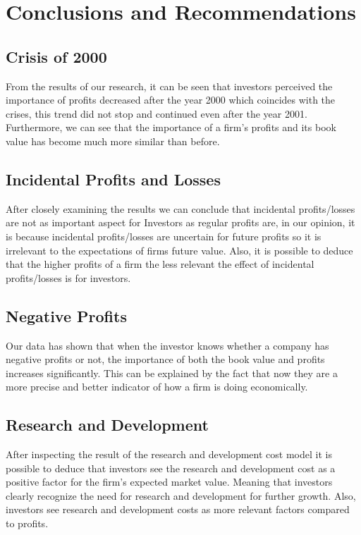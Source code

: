 \documentclass[11pt, letterpaper]{article}
\begin{document}
\newpage

\section{Conclusions and Recommendations}
\subsection{Crisis of 2000}
From the results of our research, it can be seen that investors perceived the importance of profits decreased after the year 2000 which coincides with the crises, this trend did not stop and continued even after the year 2001. Furthermore, we can see that the importance of a firm’s profits and its book value has become much more similar than before.  






\subsection{Incidental Profits and Losses}
After closely examining the results we can conclude that incidental profits/losses are not as important aspect for Investors as regular profits are, in our opinion, it is because incidental profits/losses are uncertain for future profits so it is irrelevant to the expectations of firms future value.  Also, it is possible to deduce that the higher profits of a firm the less relevant the effect of incidental profits/losses is for investors. 


\subsection{Negative Profits}
Our data has shown that when the investor knows whether a company has negative profits or not, the importance of both the book value and profits increases significantly. This can be explained by the fact that now they are a more precise and better indicator of how a firm is doing economically. 

\subsection{Research and Development}
After inspecting the result of the research and development cost model it is possible to deduce that investors see the research and development cost as a positive factor for the firm's expected market value.  Meaning that investors clearly recognize the need for research and development for further growth. Also, investors see research and development costs as more relevant factors compared to profits.
\end{document}

